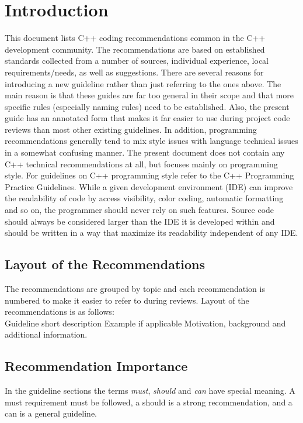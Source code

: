 \chapter{Introduction}
 This document lists C++ coding recommendations common in the C++ development community.
 The recommendations are based on established standards collected from a number of sources, individual experience, local requirements/needs, as well as suggestions.\newline
 There are several reasons for introducing a new guideline rather than just referring to the ones above. The main reason is that these guides are far too general in their scope and that more specific rules (especially naming rules) need to be established. Also, the present guide has an annotated form that makes it far easier to use during project code reviews than most other existing guidelines. In addition, programming recommendations generally tend to mix style issues with language technical issues in a somewhat confusing manner. The present document does not contain any C++ technical recommendations at all, but focuses mainly on programming style. For guidelines on C++ programming style refer to the C++ Programming Practice Guidelines.\newline
 While a given development environment (IDE) can improve the readability of code by access visibility, color coding, automatic formatting and so on, the programmer should never rely on such features. Source code should always be considered larger than the IDE it is developed within and should be written in a way that maximize its readability independent of any IDE.
 
 \section{Layout of the Recommendations}
 
 The recommendations are grouped by topic and each recommendation is numbered to make it easier to refer to during reviews.\newline
 Layout of the recommendations is as follows:\\[.5em]

\recommendation
{Guideline short description}
{Example if applicable}
{Motivation, background and additional information.}
\addtocounter{tabCounter}{-1}
\vspace{1cm}

\section{Recommendation Importance}
In the guideline sections the terms \textit{must}, \textit{should} and \textit{can} have special meaning. A must requirement must be followed, a should is a strong recommendation, and a can is a general guideline.

 